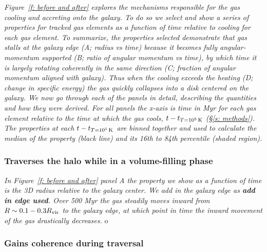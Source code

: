 \documentclass[fleqn,usenatbib]{mnras}
\newcommand{\tcon}{t_{T=10^5\,{\rm K}}}
\begin{document}
\textit{
Figure~\ref{f: before and after} explores the mechanisms responsible for the gas cooling and accreting onto the galaxy.
To do so we select and show a series of properties for tracked gas elements as a function of time relative to cooling for each gas element.
To summarize, the properties selected demonstrate that gas stalls at the galaxy edge (A; radius vs time) because it becomes fully angular-momentum supported (B; ratio of angular momentum vs time), by which time it is largely rotating coherently in the same direction (C; fraction of angular momentum aligned with galaxy).
Thus when the cooling exceeds the heating (D; change in specific energy) the gas quickly collapses into a disk centered on the galaxy.
We now go through each of the panels in detail, describing the quantities and how they were derived.
For all panels the x-axis is time in Myr for each gas element relative to the time at which the gas cools, $t - \tcon$ (\S\ref{s: methods}).
The properties at each $t - \tcon$ are binned together and used to calculate the median of the property (black line) and its 16th to 84th percentile (shaded region).
}

\subsubsection{Traverses the halo while in a volume-filling phase}

\textit{
In Figure~\ref{f: before and after} panel A the property we show as a function of time is the 3D radius relative to the galaxy center.
We add in the galaxy edge as \textbf{add in edge used}.
Over 500 Myr the gas steadily moves inward from $ R\sim 0.1 - 0.3 R_{\rm vir}$ to the galaxy edge, at which point in time the inward movement of the gas drastically decreases.
}o

\subsubsection{Gains coherence during traversal}
\end{document}

